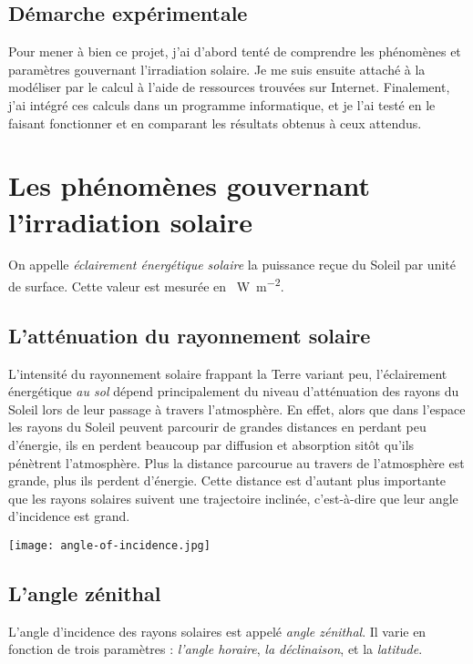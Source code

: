 \documentclass[12pt]{article}
\begin{document}
\subsection{Démarche expérimentale}

Pour mener à bien ce projet, j'ai d'abord tenté de comprendre les phénomènes et paramètres gouvernant l'irradiation solaire.
Je me suis ensuite attaché à la modéliser par le calcul à l'aide de ressources trouvées sur Internet.
Finalement, j'ai intégré ces calculs dans un programme informatique, et je l'ai testé en le faisant fonctionner et en comparant les résultats obtenus à ceux attendus.



\clearpage
\section{Les phénomènes gouvernant l'irradiation solaire}

On appelle \emph{éclairement énergétique solaire} la puissance reçue du Soleil par unité de surface.
Cette valeur est mesurée en \SI{}{\watt\per\square\meter}.

\subsection{L'atténuation du rayonnement solaire}
\label{sec:attenuation-rayonnement}
L'intensité du rayonnement solaire frappant la Terre variant peu, l'éclairement énergétique \emph{au sol} dépend principalement du niveau d'atténuation des rayons du Soleil lors de leur passage à travers l'atmosphère.
En effet, alors que dans l'espace les rayons du Soleil peuvent parcourir de grandes distances en perdant peu d'énergie, ils en perdent beaucoup par diffusion et absorption sitôt qu'ils pénètrent l'atmosphère.
Plus la distance parcourue au travers de l'atmosphère est grande, plus ils perdent d'énergie.
Cette distance est d'autant plus importante que les rayons solaires suivent une trajectoire inclinée, c'est-à-dire que leur angle d'incidence est grand.

\vfill
\centerline{\texttt{[image: angle-of-incidence.jpg]}}
\vfill

\subsection{L'angle zénithal}
\label{sec:zenith-angle}
L'angle d'incidence des rayons solaires est appelé \emph{angle zénithal}.
Il varie en fonction de trois paramètres : \emph{l'angle horaire}, \emph{la déclinaison}, et la \emph{latitude}.
\end{document}
